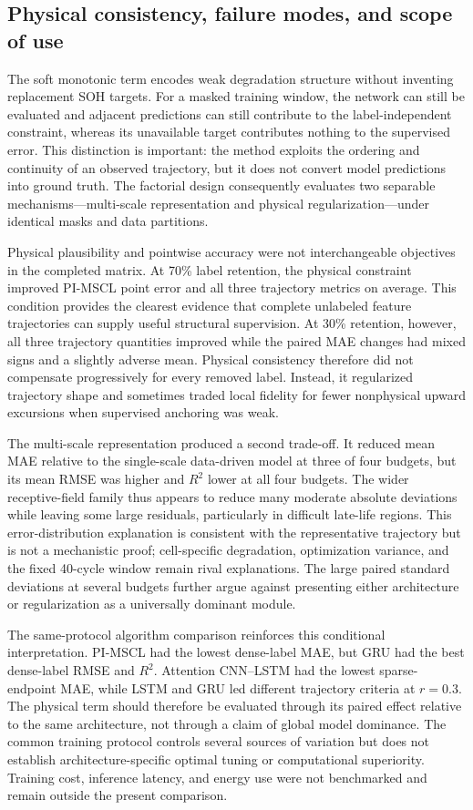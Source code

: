 \documentclass[pdflatex,sn-mathphys-num]{sn-jnl}
\begin{document}
\subsection{Physical consistency, failure modes, and scope of use}

The soft monotonic term encodes weak degradation structure without inventing replacement SOH targets. For a masked training window, the network can still be evaluated and adjacent predictions can still contribute to the label-independent constraint, whereas its unavailable target contributes nothing to the supervised error. This distinction is important: the method exploits the ordering and continuity of an observed trajectory, but it does not convert model predictions into ground truth. The factorial design consequently evaluates two separable mechanisms---multi-scale representation and physical regularization---under identical masks and data partitions.

Physical plausibility and pointwise accuracy were not interchangeable objectives in the completed matrix. At 70\% label retention, the physical constraint improved PI-MSCL point error and all three trajectory metrics on average. This condition provides the clearest evidence that complete unlabeled feature trajectories can supply useful structural supervision. At 30\% retention, however, all three trajectory quantities improved while the paired MAE changes had mixed signs and a slightly adverse mean. Physical consistency therefore did not compensate progressively for every removed label. Instead, it regularized trajectory shape and sometimes traded local fidelity for fewer nonphysical upward excursions when supervised anchoring was weak.

The multi-scale representation produced a second trade-off. It reduced mean MAE relative to the single-scale data-driven model at three of four budgets, but its mean RMSE was higher and $R^2$ lower at all four budgets. The wider receptive-field family thus appears to reduce many moderate absolute deviations while leaving some large residuals, particularly in difficult late-life regions. This error-distribution explanation is consistent with the representative trajectory but is not a mechanistic proof; cell-specific degradation, optimization variance, and the fixed 40-cycle window remain rival explanations. The large paired standard deviations at several budgets further argue against presenting either architecture or regularization as a universally dominant module.

The same-protocol algorithm comparison reinforces this conditional interpretation. PI-MSCL had the lowest dense-label MAE, but GRU had the best dense-label RMSE and $R^2$. Attention CNN--LSTM had the lowest sparse-endpoint MAE, while LSTM and GRU led different trajectory criteria at $r=0.3$. The physical term should therefore be evaluated through its paired effect relative to the same architecture, not through a claim of global model dominance. The common training protocol controls several sources of variation but does not establish architecture-specific optimal tuning or computational superiority. Training cost, inference latency, and energy use were not benchmarked and remain outside the present comparison.
\end{document}
